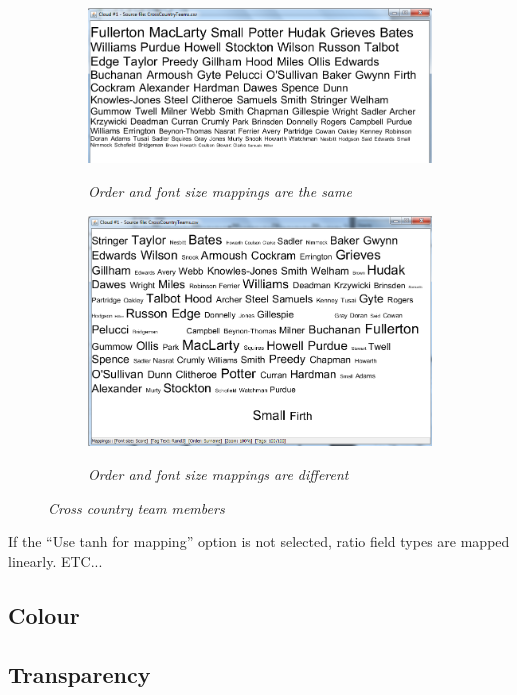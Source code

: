 \begin{figure}[h!]
\begin{subfigure}{\textwidth}
	\centering
	\includegraphics[scale=0.50]{adjacentfont.png}
	\label{fig:adjacentfont}
	\caption{\textit{Order and font size mappings are the same}}
\end{subfigure}
\begin{subfigure}{\textwidth}
  \centering
  \includegraphics[scale=0.50]{mixedfont.png}
  \label{fig:mixedfont}
  \caption{\textit{Order and font size mappings are different}}
\end{subfigure}
  \caption{\textit{Cross country team members}}
  \label{fig:fontsize}
\end{figure}

If the ``Use tanh for mapping'' option is not selected, ratio field types are mapped linearly. ETC...

\subsection{Colour} \label{colourmappings}

\subsection{Transparency}


